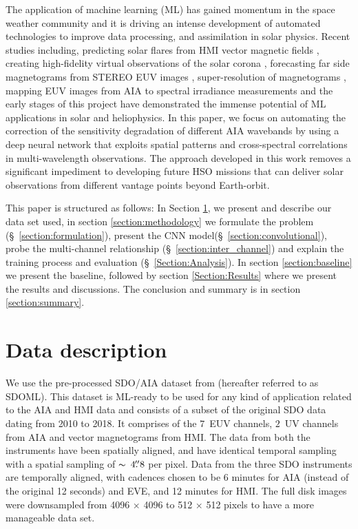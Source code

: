 \documentclass[twocolumn,usenames,dvipsnames]{aastex63}
\begin{document}
 The application of machine learning (ML) \citep{bishop2006pattern} has gained momentum in the space weather community and it is driving an intense development of automated technologies to improve data processing, and assimilation in solar physics. Recent studies including, predicting solar flares from HMI vector magnetic fields \citep{Bobra_2015}, creating high-fidelity virtual observations of the solar corona \citep[\citealt{salvatelli2019} \&][]{Cheung2019}, forecasting far side magnetograms from STEREO EUV images \citep{Kim_NatAs_2019}, super-resolution of magnetograms \citep{jungbluth-2019-super}, mapping EUV images from AIA to spectral irradiance measurements \citep{Szenicereaaw6548} and the early stages of this project \citep{neuberg2019} have demonstrated the immense potential of ML applications in solar and heliophysics. In this paper, we focus on automating the correction of the sensitivity degradation of different AIA wavebands by using a deep neural network \citep{goodfellow2016deep} that exploits spatial patterns and cross-spectral correlations in multi-wavelength observations. The approach developed in this work removes a significant impediment to developing future HSO missions that can deliver solar observations from different vantage points beyond Earth-orbit.
 
This paper is structured as follows: In Section \ref{Section:data}, we present and describe our data set used, in section \ref{section:methodology} we formulate the problem (\S~\ref{section:formulation}), present the CNN model(\S~\ref{section:convolutional}), probe the multi-channel relationship (\S~\ref{section:inter_channel}) and explain the training process and evaluation (\S~\ref{Section:Analysis}). In section \ref{section:baseline} we present the baseline, followed by section \ref{Section:Results} where we present the results and discussions. The conclusion and summary is in section \ref{section:summary}.
 
\section{Data description}
\label{Section:data}

We use the pre-processed SDO/AIA dataset from \citet{SDOML} (hereafter referred to as SDOML). This dataset is ML-ready to be used for any kind of application related to the AIA and HMI data and consists of a subset of the original SDO data dating from 2010 to 2018. It comprises of the $7$~EUV channels, $2$~UV channels from AIA and vector magnetograms from HMI. The data from both the instruments have been spatially aligned, and have identical temporal sampling with a spatial sampling of $\thicksim$ $4\mbox{$.\!\!^{\prime\prime}$}8$ per pixel. Data from the three SDO instruments are temporally aligned, with cadences chosen to be 6 minutes for AIA (instead of the original 12 seconds) and EVE, and 12 minutes for HMI. The full disk images were downsampled from 4096 $\times$ 4096 to 512 $\times$ 512 pixels to have a more manageable data set.
\end{document}
